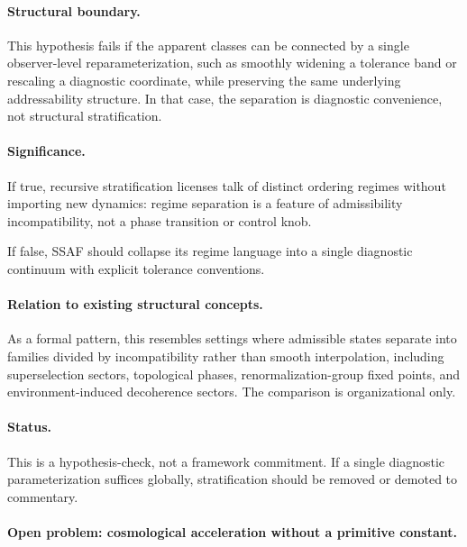 \documentclass[aps,prx,onecolumn,11pt]{revtex4-2}
\theoremstyle{plain}
\theoremstyle{definition}
\theoremstyle{remark}
\begin{document}
\paragraph{Structural boundary.}

This hypothesis fails if the apparent classes can be connected by a
single observer-level reparameterization, such as smoothly widening a
tolerance band or rescaling a diagnostic coordinate, while preserving
the same underlying addressability structure. In that case, the
separation is diagnostic convenience, not structural stratification.

\paragraph{Significance.}

If true, recursive stratification licenses talk of distinct ordering
regimes without importing new dynamics: regime separation is a feature
of admissibility incompatibility, not a phase transition or control
knob.

If false, SSAF should collapse its regime language into a single
diagnostic continuum with explicit tolerance conventions.

\paragraph{Relation to existing structural concepts.}

As a formal pattern, this resembles settings where admissible states
separate into families divided by incompatibility rather than smooth
interpolation, including superselection sectors, topological phases,
renormalization-group fixed points, and environment-induced decoherence
sectors. The comparison is organizational only.

\paragraph{Status.}

This is a hypothesis-check, not a framework commitment. If a single
diagnostic parameterization suffices globally, stratification should be
removed or demoted to commentary.

\paragraph{Open problem: cosmological acceleration without a primitive constant.}
\end{document}
